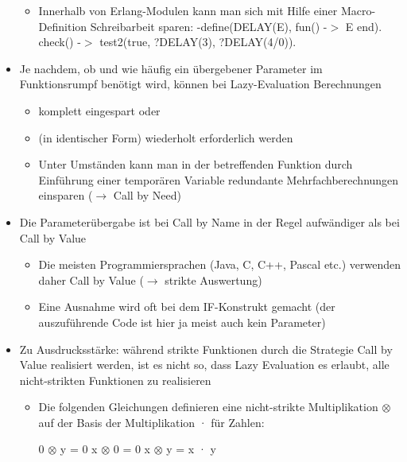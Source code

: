 \documentclass[10pt]{article}
\begin{document}
\begin{itemize}
\begin{itemize}
          \item Innerhalb von Erlang-Modulen kann man sich mit Hilfe einer Macro-Definition Schreibarbeit sparen: \newline -define(DELAY(E), fun() -$>$ E end). \newline check() -$>$ test2(true, ?DELAY(3), ?DELAY(4/0)).
        \end{itemize}
  \item Je nachdem, ob und wie häufig ein übergebener Parameter im Funktionsrumpf benötigt wird, können bei Lazy-Evaluation Berechnungen
        \begin{itemize}
          \item komplett eingespart oder
          \item (in identischer Form) wiederholt erforderlich werden
          \item Unter Umständen kann man in der betreffenden Funktion durch Einführung einer temporären Variable redundante Mehrfachberechnungen einsparen ($\rightarrow$ Call by Need)
        \end{itemize}
  \item Die Parameterübergabe ist bei Call by Name in der Regel aufwändiger als bei Call by Value
        \begin{itemize}
          \item Die meisten Programmiersprachen (Java, C, C++, Pascal etc.) verwenden daher Call by Value ($\rightarrow$ strikte Auswertung)
          \item Eine Ausnahme wird oft bei dem IF-Konstrukt gemacht (der auszuführende Code ist hier ja meist auch kein Parameter)
        \end{itemize}
  \item Zu Ausdrucksstärke: während strikte Funktionen durch die Strategie Call by Value realisiert werden, ist es nicht so, dass Lazy Evaluation es erlaubt, alle nicht-strikten Funktionen zu realisieren
        \begin{itemize}
          \item Die folgenden Gleichungen definieren eine nicht-strikte Multiplikation $\otimes$ auf der Basis der Multiplikation · für Zahlen:\newline \begin{center}
                  0 $\otimes$ y = 0 \newline
                  x $\otimes$ 0 = 0 \newline
                  x $\otimes$ y = x · y \newline
                \end{center}

\end{itemize}
\end{itemize}
\end{document}
